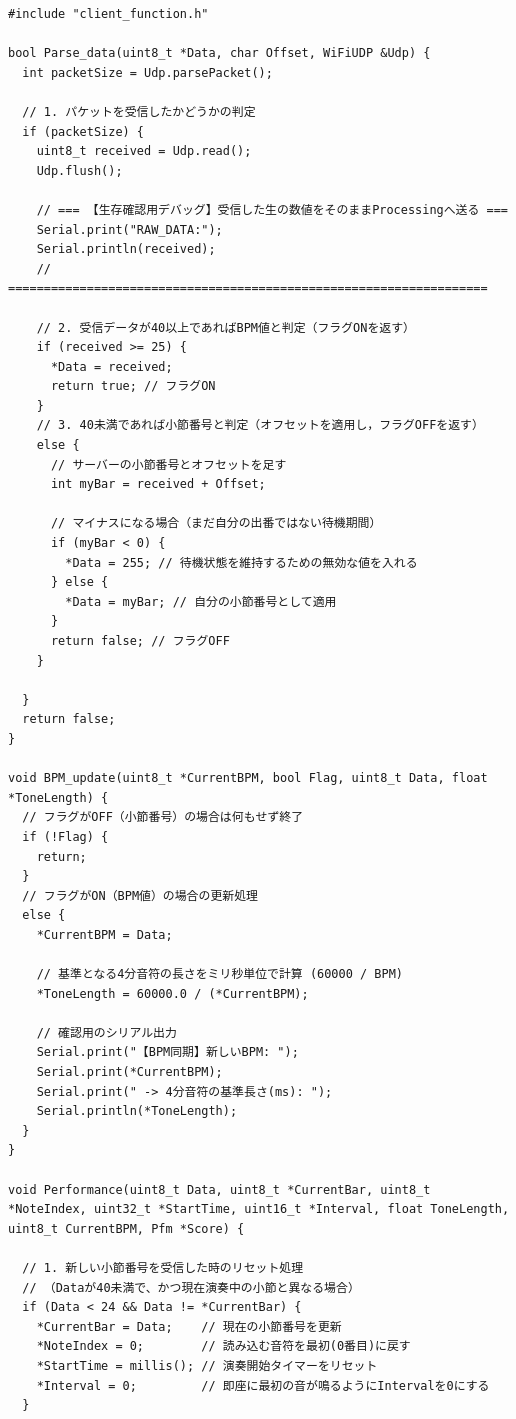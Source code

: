 \begin{lstlisting}
#include "client_function.h"

bool Parse_data(uint8_t *Data, char Offset, WiFiUDP &Udp) {
  int packetSize = Udp.parsePacket();
  
  // 1. パケットを受信したかどうかの判定
  if (packetSize) {
    uint8_t received = Udp.read();
    Udp.flush();

    // === 【生存確認用デバッグ】受信した生の数値をそのままProcessingへ送る ===
    Serial.print("RAW_DATA:");
    Serial.println(received);
    // ===================================================================
    
    // 2. 受信データが40以上であればBPM値と判定（フラグONを返す）
    if (received >= 25) {
      *Data = received;
      return true; // フラグON
    }
    // 3. 40未満であれば小節番号と判定（オフセットを適用し，フラグOFFを返す）
    else {
      // サーバーの小節番号とオフセットを足す
      int myBar = received + Offset; 
      
      // マイナスになる場合（まだ自分の出番ではない待機期間）
      if (myBar < 0) {
        *Data = 255; // 待機状態を維持するための無効な値を入れる
      } else {
        *Data = myBar; // 自分の小節番号として適用
      }
      return false; // フラグOFF
    }

  }
  return false;
}

void BPM_update(uint8_t *CurrentBPM, bool Flag, uint8_t Data, float *ToneLength) {
  // フラグがOFF（小節番号）の場合は何もせず終了
  if (!Flag) {
    return;
  } 
  // フラグがON（BPM値）の場合の更新処理
  else {
    *CurrentBPM = Data;
    
    // 基準となる4分音符の長さをミリ秒単位で計算 (60000 / BPM)
    *ToneLength = 60000.0 / (*CurrentBPM);
    
    // 確認用のシリアル出力
    Serial.print("【BPM同期】新しいBPM: ");
    Serial.print(*CurrentBPM);
    Serial.print(" -> 4分音符の基準長さ(ms): ");
    Serial.println(*ToneLength);
  }
}

void Performance(uint8_t Data, uint8_t *CurrentBar, uint8_t *NoteIndex, uint32_t *StartTime, uint16_t *Interval, float ToneLength, uint8_t CurrentBPM, Pfm *Score) {
  
  // 1. 新しい小節番号を受信した時のリセット処理
  // （Dataが40未満で、かつ現在演奏中の小節と異なる場合）
  if (Data < 24 && Data != *CurrentBar) {
    *CurrentBar = Data;    // 現在の小節番号を更新
    *NoteIndex = 0;        // 読み込む音符を最初(0番目)に戻す
    *StartTime = millis(); // 演奏開始タイマーをリセット
    *Interval = 0;         // 即座に最初の音が鳴るようにIntervalを0にする
  }


\end{lstlisting}
